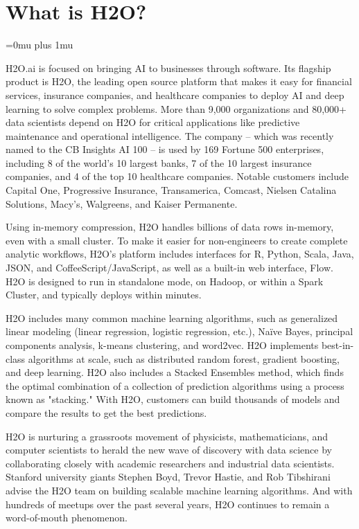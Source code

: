 \documentclass{standalone}
\begin{document}
\section{What is H2O?}
\Urlmuskip=0mu plus 1mu\relax %


H2O.ai is focused on bringing AI to businesses through software. Its flagship product is H2O, the leading open source platform that makes it easy for financial services, insurance companies, and healthcare companies to deploy AI and deep learning to solve complex problems. More than 9,000 organizations and 80,000+ data scientists depend on H2O for critical applications like predictive maintenance and operational intelligence. The company -- which was recently named to the CB Insights AI 100 -- is used by 169 Fortune 500 enterprises, including 8 of the world's 10 largest banks, 7 of the 10 largest insurance companies, and 4 of the top 10 healthcare companies. Notable customers include Capital One, Progressive Insurance, Transamerica, Comcast, Nielsen Catalina Solutions, Macy's, Walgreens, and Kaiser Permanente.

Using in-memory compression, H2O handles billions of data rows in-memory, even with a small cluster. To make it easier for non-engineers to create complete analytic workflows, H2O's platform includes interfaces for R, Python, Scala, Java, JSON, and CoffeeScript/JavaScript, as well as a built-in web interface, Flow. H2O is designed to run in standalone mode, on Hadoop, or within a Spark Cluster, and typically deploys within minutes.

H2O includes many common machine learning algorithms, such as generalized linear modeling (linear regression, logistic regression, etc.), Na\"{i}ve Bayes, principal components analysis, k-means clustering, and word2vec. H2O implements best-in-class algorithms at scale, such as distributed random forest, gradient boosting, and deep learning. H2O also includes a Stacked Ensembles method, which finds the optimal combination of a collection of prediction algorithms using a process known as "stacking." With H2O, customers can build thousands of models and compare the results to get the best predictions. 

H2O is nurturing a grassroots movement of physicists, mathematicians, and computer scientists to herald the new wave of discovery with data science by collaborating closely with academic researchers and industrial data scientists. Stanford university giants Stephen Boyd, Trevor Hastie, and Rob Tibshirani advise the H2O team on building scalable machine learning algorithms. And with hundreds of meetups over the past several years, H2O continues to remain a word-of-mouth phenomenon. 
\end{document}
